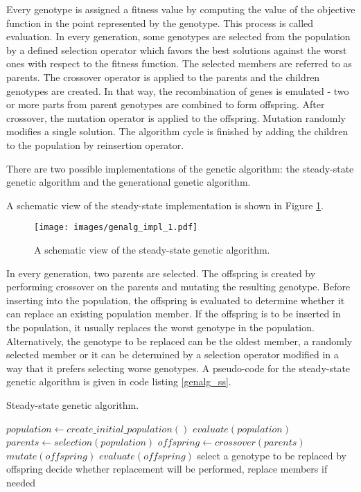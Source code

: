 Every genotype is assigned a fitness value by computing the value of the objective function in the point represented by the genotype.
This process is called evaluation.
In every generation, some genotypes are selected from the population by a defined selection operator which favors the best solutions against the worst ones with respect to the fitness function.
The selected members are referred to as parents.
The crossover operator is applied to the parents and the children genotypes are created.
In that way, the recombination of genes is emulated - two or more parts from parent genotypes are combined to form offspring.
After crossover, the mutation operator is applied to the offspring.
Mutation randomly modifies a single solution.
The algorithm cycle is finished by adding the children to the population by reinsertion operator.

There are two possible implementations of the genetic algorithm: the steady-state genetic algorithm and the generational genetic algorithm.

A schematic view of the steady-state implementation is shown in Figure \ref{genalg:impl_1}.
\begin{figure}[ht]
    \centering
    \texttt{[image: images/genalg\_impl\_1.pdf]}
    \caption{A schematic view of the steady-state genetic algorithm.}
    \label{genalg:impl_1}
\end{figure}
In every generation, two parents are selected.
The offspring is created by performing crossover on the parents and mutating the resulting genotype.
Before inserting into the population, the offspring is evaluated to determine whether it can replace an existing population member.
If the offspring is to be inserted in the population, it usually replaces the worst genotype in the population.
Alternatively, the genotype to be replaced can be the oldest member, a randomly selected member or it can be determined by a selection operator modified in a way that it prefers selecting worse genotypes.
A pseudo-code for the steady-state genetic algorithm is given in code listing \ref{genalg_ss}.
\begin{algorithm}
\caption{Steady-state genetic algorithm.\label{genalg_ss}}
\begin{algorithmic}
\STATE $population \leftarrow create\_initial\_population()$
\STATE $evaluate(population)$
\STATE $parents \leftarrow selection(population)$
\STATE $offspring \leftarrow crossover(parents)$
\STATE $mutate(offspring)$
\STATE $evaluate(offspring)$
\STATE select a genotype to be replaced by offspring
\STATE decide whether replacement will be performed, replace members if needed
\ENDWHILE
\end{algorithmic}
\end{algorithm}

